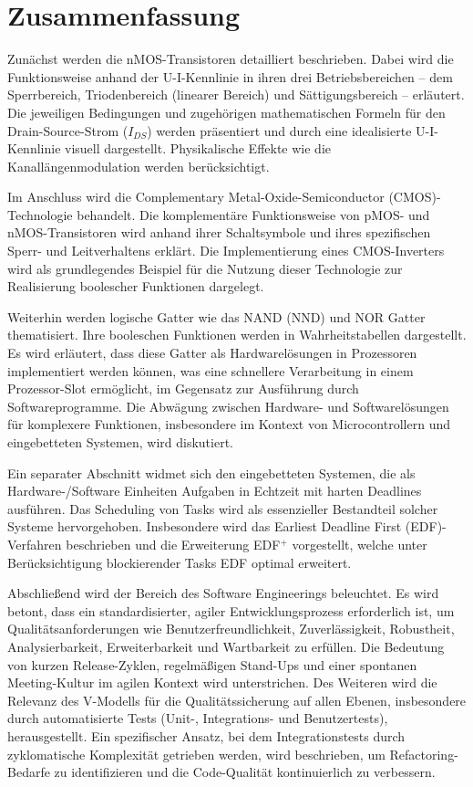 \documentclass{scrarticle}
\numberwithin{equation}{section}
\begin{document}
\section{Zusammenfassung}
Zunächst werden die nMOS-Transistoren detailliert beschrieben. Dabei wird die Funktionsweise anhand der U-I-Kennlinie in ihren drei Betriebsbereichen -- dem Sperrbereich, Triodenbereich (linearer Bereich) und Sättigungsbereich -- erläutert. Die jeweiligen Bedingungen und zugehörigen mathematischen Formeln für den Drain-Source-Strom ($I_{DS}$) werden präsentiert und durch eine idealisierte U-I-Kennlinie visuell dargestellt. Physikalische Effekte wie die Kanallängenmodulation werden berücksichtigt.

Im Anschluss wird die Complementary Metal-Oxide-Semiconductor (CMOS)-Technologie behandelt. Die komplementäre Funktionsweise von pMOS- und nMOS-Transistoren wird anhand ihrer Schaltsymbole und ihres spezifischen Sperr- und Leitverhaltens erklärt. Die Implementierung eines CMOS-Inverters wird als grundlegendes Beispiel für die Nutzung dieser Technologie zur Realisierung boolescher Funktionen dargelegt.

Weiterhin werden logische Gatter wie das NAND (NND) und NOR Gatter thematisiert. Ihre booleschen Funktionen werden in Wahrheitstabellen dargestellt. Es wird erläutert, dass diese Gatter als Hardwarelösungen in Prozessoren implementiert werden können, was eine schnellere Verarbeitung in einem Prozessor-Slot ermöglicht, im Gegensatz zur Ausführung durch Softwareprogramme. Die Abwägung zwischen Hardware- und Softwarelösungen für komplexere Funktionen, insbesondere im Kontext von Microcontrollern und eingebetteten Systemen, wird diskutiert.

Ein separater Abschnitt widmet sich den eingebetteten Systemen, die als Hardware-/Software Einheiten Aufgaben in Echtzeit mit harten Deadlines ausführen. Das Scheduling von Tasks wird als essenzieller Bestandteil solcher Systeme hervorgehoben. Insbesondere wird das Earliest Deadline First (EDF)-Verfahren beschrieben und die Erweiterung EDF$^+$ vorgestellt, welche unter Berücksichtigung blockierender Tasks EDF optimal erweitert.

Abschließend wird der Bereich des Software Engineerings beleuchtet. Es wird betont, dass ein standardisierter, agiler Entwicklungsprozess erforderlich ist, um Qualitätsanforderungen wie Benutzerfreundlichkeit, Zuverlässigkeit, Robustheit, Analysierbarkeit, Erweiterbarkeit und Wartbarkeit zu erfüllen. Die Bedeutung von kurzen Release-Zyklen, regelmäßigen Stand-Ups und einer spontanen Meeting-Kultur im agilen Kontext wird unterstrichen. Des Weiteren wird die Relevanz des V-Modells für die Qualitätssicherung auf allen Ebenen, insbesondere durch automatisierte Tests (Unit-, Integrations- und Benutzertests), herausgestellt. Ein spezifischer Ansatz, bei dem Integrationstests durch zyklomatische Komplexität getrieben werden, wird beschrieben, um Refactoring-Bedarfe zu identifizieren und die Code-Qualität kontinuierlich zu verbessern.
\end{document}
